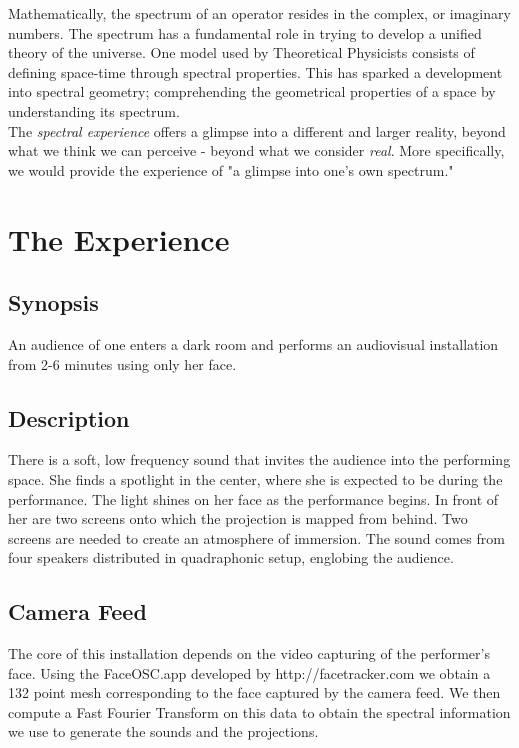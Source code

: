 \documentclass{article}
\begin{document}
\noindent Mathematically, the spectrum of an operator resides in the complex, or imaginary numbers. The spectrum has a fundamental role in trying to develop a unified theory of the universe. One model used by Theoretical Physicists consists of defining space-time through spectral properties. This has sparked a development into spectral geometry; comprehending the geometrical properties of a space by understanding its spectrum. \\

\noindent The \textit{spectral experience} offers a glimpse into a different and larger reality, beyond what we think we can perceive - beyond what we consider \textit{real}. More specifically, we would provide the experience of "a glimpse into one's own spectrum."\\



\section{The Experience}

\subsection{Synopsis}
\noindent An audience of one enters a dark room and performs an audiovisual installation from 2-6 minutes using only her face.

\subsection{Description}
There is a soft, low frequency sound that invites the audience into the performing space. She finds a spotlight in the center, where she is expected to be during the performance. The light shines on her face as the performance begins. In front of her are two screens onto which the projection is mapped from behind. Two screens are needed to create an atmosphere of immersion. The sound comes from four speakers distributed in quadraphonic setup, englobing the audience. 

\subsection{Camera Feed}
The core of this installation  depends on the video capturing of the performer's face. Using the FaceOSC.app developed by http://facetracker.com we obtain a 132 point mesh corresponding to the face captured by the camera feed. We then compute a Fast Fourier Transform on this data to obtain the spectral information we use to generate the sounds and the projections.
\end{document}
